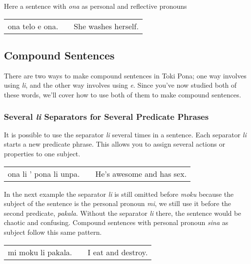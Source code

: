 Here a sentence with \textit{ona} as personal and reflective pronouns

\begin{supertabular}{p{5,5cm}|ll}
ona telo e ona. && She washes herself. \\
\end{supertabular}

\subsection*{Compound Sentences}
%
%
There are two ways to make compound sentences in Toki Pona; one way involves using \textit{li}, and the other way involves using \textit{e}. 
Since you've now studied both of these words, we'll cover how to use both of them to make compound sentences. 

\label{'multiple_li'}
\subsubsection*{Several \textit{li} Separators for Several Predicate Phrases}
%
%

It is possible to use the separator \textit{li} several times in a sentence. 
Each separator \textit{li} starts a new predicate phrase. 
This allows you to assign several actions or properties to one subject. 

\begin{supertabular}{p{5,5cm}|ll}
ona li ' pona li unpa. && He's awesome and has sex. \\
\end{supertabular} 

In the next example the separator \textit{li} is still omitted before \textit{moku} because the subject of the sentence is the personal pronoun \textit{mi}, we still use it before the second predicate, \textit{pakala}. 
Without the separator \textit{li} there, the sentence would be chaotic and confusing. 
Compound sentences with personal pronoun \textit{sina} as subject follow this same pattern. 

\begin{supertabular}{p{5,5cm}|ll}
mi moku li pakala. && I eat and destroy. \\
\end{supertabular} 

